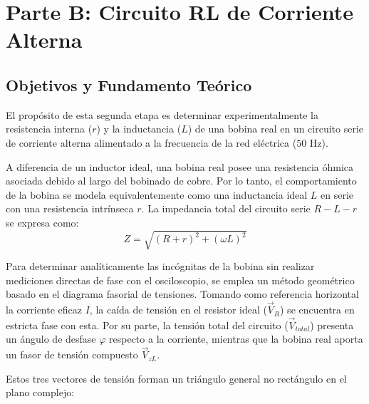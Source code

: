 \section{Parte B: Circuito RL de Corriente Alterna}

\subsection{Objetivos y Fundamento Teórico}
El propósito de esta segunda etapa es determinar experimentalmente la resistencia interna ($r$) y la inductancia ($L$) de una bobina real en un circuito serie de corriente alterna alimentado a la frecuencia de la red eléctrica ($50\text{ Hz}$). 

A diferencia de un inductor ideal, una bobina real posee una resistencia óhmica asociada debido al largo del bobinado de cobre. Por lo tanto, el comportamiento de la bobina se modela equivalentemente como una inductancia ideal $L$ en serie con una resistencia intrínseca $r$. La impedancia total del circuito serie $R - L - r$ se expresa como:
\begin{equation}
Z = \sqrt{(R+r)^2 + (\omega L)^2}
\end{equation}

Para determinar analíticamente las incógnitas de la bobina sin realizar mediciones directas de fase con el osciloscopio, se emplea un método geométrico basado en el diagrama fasorial de tensiones. Tomando como referencia horizontal la corriente eficaz $I$, la caída de tensión en el resistor ideal ($\vec{V}_R$) se encuentra en estricta fase con esta. Por su parte, la tensión total del circuito ($\vec{V}_{total}$) presenta un ángulo de desfase $\varphi$ respecto a la corriente, mientras que la bobina real aporta un fasor de tensión compuesto $\vec{V}_{zL}$.

Estos tres vectores de tensión forman un triángulo general no rectángulo en el plano complejo:

